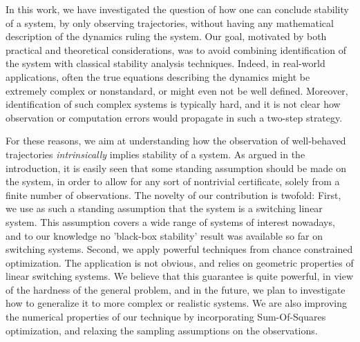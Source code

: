 In this work, we have investigated the question of how one can conclude stability of a system, by only observing trajectories, without having any mathematical description of the dynamics ruling the system.   Our goal, motivated by both practical and theoretical considerations, was to avoid combining identification of the system with classical stability analysis techniques.  Indeed, in real-world applications, often the true equations describing the dynamics might be extremely complex or nonstandard, or might even not be well defined. Moreover, identification of such complex systems is typically hard, and it is not clear how observation or computation errors would propagate in such a two-step strategy. 

For these reasons, we aim at understanding how the observation of well-behaved trajectories \emph{intrinsically} implies stability of a system.  As argued in the introduction, it is easily seen that some standing assumption should be made on the system, in order to allow for any sort of nontrivial certificate, solely from a finite number of observations. The novelty of our contribution is twofold: 
First, we use as such a standing assumption that the system is a switching linear system.  This assumption covers a wide range of systems of interest nowadays, and to our knowledge no 'black-box stability' result was available so far on switching systems.  
Second, we apply powerful techniques from chance constrained optimization.  The application is not obvious, and relies on geometric properties of linear switching systems. We believe that this guarantee is quite powerful, in view of the hardness of the general problem, and in the future, we plan to investigate how to generalize it to more complex or realistic systems.  We are also improving the numerical properties of our technique by incorporating Sum-Of-Squares optimization, and relaxing the sampling assumptions on the observations.
